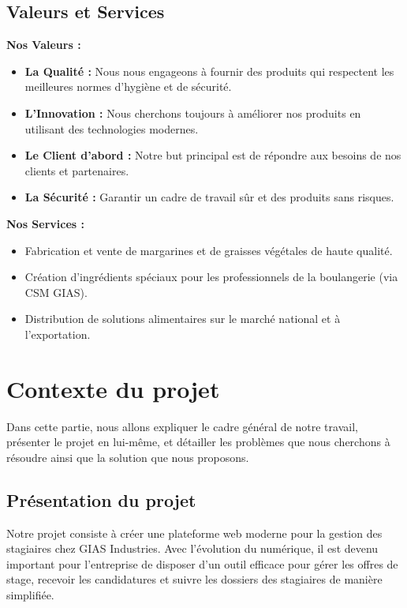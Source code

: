 \subsection{Valeurs et Services}

\textbf{Nos Valeurs :}
\begin{itemize}
    \item \textbf{La Qualité :} Nous nous engageons à fournir des produits qui respectent les meilleures normes d'hygiène et de sécurité.
    \item \textbf{L'Innovation :} Nous cherchons toujours à améliorer nos produits en utilisant des technologies modernes.
    \item \textbf{Le Client d'abord :} Notre but principal est de répondre aux besoins de nos clients et partenaires.
    \item \textbf{La Sécurité :} Garantir un cadre de travail sûr et des produits sans risques.
\end{itemize}

\textbf{Nos Services :}
\begin{itemize}
    \item Fabrication et vente de margarines et de graisses végétales de haute qualité.
    \item Création d'ingrédients spéciaux pour les professionnels de la boulangerie (via CSM GIAS).
    \item Distribution de solutions alimentaires sur le marché national et à l'exportation.
\end{itemize}

\section{Contexte du projet}
Dans cette partie, nous allons expliquer le cadre général de notre travail, présenter le projet en lui-même, et détailler les problèmes que nous cherchons à résoudre ainsi que la solution que nous proposons.

\subsection{Présentation du projet}
Notre projet consiste à créer une plateforme web moderne pour la gestion des stagiaires chez GIAS Industries. Avec l'évolution du numérique, il est devenu important pour l'entreprise de disposer d'un outil efficace pour gérer les offres de stage, recevoir les candidatures et suivre les dossiers des stagiaires de manière simplifiée.

